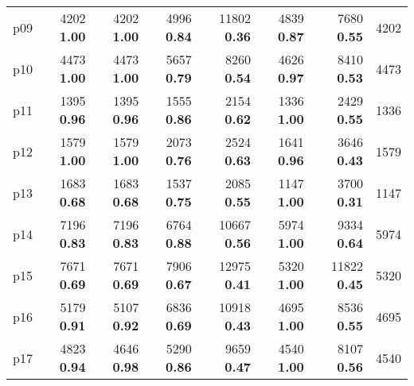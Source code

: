 \begin{tabular}{lrrrrrrr}
\multicolumn{1}{l|}{p09} & {\footnotesize 4202} \textbf{1.00} & {\footnotesize 4202} \textbf{1.00} & {\footnotesize 4996} \textbf{0.84} & {\footnotesize 11802} \textbf{0.36} & {\footnotesize 4839} \textbf{0.87} & {\footnotesize 7680} \textbf{0.55} & \multicolumn{1}{|r}{4202}\\
\multicolumn{1}{l|}{p10} & {\footnotesize 4473} \textbf{1.00} & {\footnotesize 4473} \textbf{1.00} & {\footnotesize 5657} \textbf{0.79} & {\footnotesize 8260} \textbf{0.54} & {\footnotesize 4626} \textbf{0.97} & {\footnotesize 8410} \textbf{0.53} & \multicolumn{1}{|r}{4473}\\
\multicolumn{1}{l|}{p11} & {\footnotesize 1395} \textbf{0.96} & {\footnotesize 1395} \textbf{0.96} & {\footnotesize 1555} \textbf{0.86} & {\footnotesize 2154} \textbf{0.62} & {\footnotesize 1336} \textbf{1.00} & {\footnotesize 2429} \textbf{0.55} & \multicolumn{1}{|r}{1336}\\
\multicolumn{1}{l|}{p12} & {\footnotesize 1579} \textbf{1.00} & {\footnotesize 1579} \textbf{1.00} & {\footnotesize 2073} \textbf{0.76} & {\footnotesize 2524} \textbf{0.63} & {\footnotesize 1641} \textbf{0.96} & {\footnotesize 3646} \textbf{0.43} & \multicolumn{1}{|r}{1579}\\
\multicolumn{1}{l|}{p13} & {\footnotesize 1683} \textbf{0.68} & {\footnotesize 1683} \textbf{0.68} & {\footnotesize 1537} \textbf{0.75} & {\footnotesize 2085} \textbf{0.55} & {\footnotesize 1147} \textbf{1.00} & {\footnotesize 3700} \textbf{0.31} & \multicolumn{1}{|r}{1147}\\
\multicolumn{1}{l|}{p14} & {\footnotesize 7196} \textbf{0.83} & {\footnotesize 7196} \textbf{0.83} & {\footnotesize 6764} \textbf{0.88} & {\footnotesize 10667} \textbf{0.56} & {\footnotesize 5974} \textbf{1.00} & {\footnotesize 9334} \textbf{0.64} & \multicolumn{1}{|r}{5974}\\
\multicolumn{1}{l|}{p15} & {\footnotesize 7671} \textbf{0.69} & {\footnotesize 7671} \textbf{0.69} & {\footnotesize 7906} \textbf{0.67} & {\footnotesize 12975} \textbf{0.41} & {\footnotesize 5320} \textbf{1.00} & {\footnotesize 11822} \textbf{0.45} & \multicolumn{1}{|r}{5320}\\
\multicolumn{1}{l|}{p16} & {\footnotesize 5179} \textbf{0.91} & {\footnotesize 5107} \textbf{0.92} & {\footnotesize 6836} \textbf{0.69} & {\footnotesize 10918} \textbf{0.43} & {\footnotesize 4695} \textbf{1.00} & {\footnotesize 8536} \textbf{0.55} & \multicolumn{1}{|r}{4695}\\
\multicolumn{1}{l|}{p17} & {\footnotesize 4823} \textbf{0.94} & {\footnotesize 4646} \textbf{0.98} & {\footnotesize 5290} \textbf{0.86} & {\footnotesize 9659} \textbf{0.47} & {\footnotesize 4540} \textbf{1.00} & {\footnotesize 8107} \textbf{0.56} & \multicolumn{1}{|r}{4540}\\

\end{tabular}
